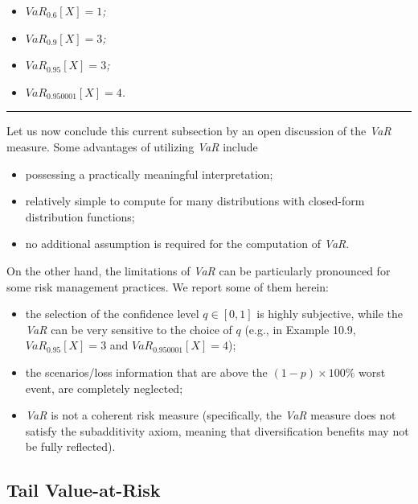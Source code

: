 \documentclass[]{book}
\providecommand{\tightlist}{%
  \setlength{\itemsep}{0pt}\setlength{\parskip}{0pt}}
\theoremstyle{definition}
\theoremstyle{definition}
\theoremstyle{definition}
\theoremstyle{remark}
\begin{document}
\begin{itemize}
\tightlist
\item
  \emph{\(VaR_{0.6}[X]=1\);}
\item
  \emph{\(VaR_{0.9}[X]=3\);}
\item
  \emph{\(VaR_{0.95}[X]=3\);}
\item
  \emph{\(VaR_{0.950001}[X]=4\).}
\end{itemize}

\begin{center}\rule{0.5\linewidth}{\linethickness}\end{center}

Let us now conclude this current subsection by an open discussion of the
\emph{VaR} measure. Some advantages of utilizing \emph{VaR} include

\begin{itemize}
\tightlist
\item
  possessing a practically meaningful interpretation;
\item
  relatively simple to compute for many distributions with closed-form
  distribution functions;
\item
  no additional assumption is required for the computation of
  \emph{VaR}.
\end{itemize}

On the other hand, the limitations of \emph{VaR} can be particularly
pronounced for some risk management practices. We report some of them
herein:

\begin{itemize}
\tightlist
\item
  the selection of the confidence level \(q\in [0,1]\) is highly
  subjective, while the \emph{VaR} can be very sensitive to the choice
  of \(q\) (e.g., in Example 10.9, \(VaR_{0.95}[X]=3\) and
  \(VaR_{0.950001}[X]=4\));
\item
  the scenarios/loss information that are above the
  \((1-p)\times 100\%\) worst event, are completely neglected;
\item
  \emph{VaR} is not a coherent risk measure (specifically, the
  \emph{VaR} measure does not satisfy the subadditivity axiom, meaning
  that diversification benefits may not be fully reflected).
\end{itemize}

\subsection{Tail Value-at-Risk}\label{tail-value-at-risk}
\end{document}
